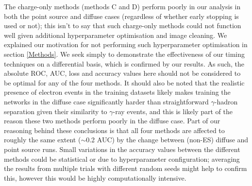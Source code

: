 The charge-only methods \cite{Shilon} (methods C and D) perform poorly in our analysis in both the point source and diffuse cases (regardless of whether early stopping is used or not); this isn't to say that such charge-only methods could not function well given additional hyperparameter optimisation and image cleaning. We explained our motivation for not performing such hyperparameter optimisation in section \ref{Methods}. We seek simply to demonstrate the effectiveness of our timing techniques on a differential basis, which is confirmed by our results. As such, the absolute ROC, AUC, loss and accuracy values here should not be considered to be optimal for any of the four methods. It should also be noted that the realistic presence of electron events in the training datasets likely makes training the networks in the diffuse case significantly harder than straightforward $\gamma$-hadron separation given their similarity to $\gamma$-ray events, and this is likely part of the reason these two methods perform poorly in the diffuse case. Part of our reasoning behind these conclusions is that all four methods are affected to roughly the same extent ($\sim$0.2 AUC) by the change between (non-ES) diffuse and point source runs. Small variations in the accuracy values between the different methods could be statistical or due to hyperparameter configuration; averaging the results from multiple trials with different random seeds might help to confirm this, however this would be highly computationally intensive.


